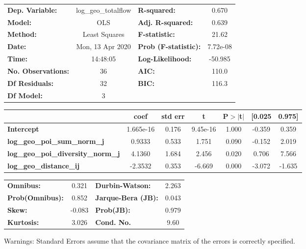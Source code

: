 \begin{center}
\begin{tabular}{lclc}
\toprule
\textbf{Dep. Variable:}                    & log\_geo\_totalflow & \textbf{  R-squared:         } &     0.670   \\
\textbf{Model:}                            &         OLS         & \textbf{  Adj. R-squared:    } &     0.639   \\
\textbf{Method:}                           &    Least Squares    & \textbf{  F-statistic:       } &     21.62   \\
\textbf{Date:}                             &   Mon, 13 Apr 2020  & \textbf{  Prob (F-statistic):} &  7.72e-08   \\
\textbf{Time:}                             &       14:48:05      & \textbf{  Log-Likelihood:    } &   -50.985   \\
\textbf{No. Observations:}                 &            36       & \textbf{  AIC:               } &     110.0   \\
\textbf{Df Residuals:}                     &            32       & \textbf{  BIC:               } &     116.3   \\
\textbf{Df Model:}                         &             3       & \textbf{                     } &             \\
\bottomrule
\end{tabular}
\begin{tabular}{lcccccc}
                                           & \textbf{coef} & \textbf{std err} & \textbf{t} & \textbf{P$> |$t$|$} & \textbf{[0.025} & \textbf{0.975]}  \\
\midrule
\textbf{Intercept}                         &    1.665e-16  &        0.176     &  9.45e-16  &         1.000        &       -0.359    &        0.359     \\
\textbf{log\_geo\_poi\_sum\_norm\_j}       &       0.9333  &        0.533     &     1.751  &         0.090        &       -0.152    &        2.019     \\
\textbf{log\_geo\_poi\_diversity\_norm\_j} &       4.1360  &        1.684     &     2.456  &         0.020        &        0.706    &        7.566     \\
\textbf{log\_geo\_distance\_ij}            &      -2.3532  &        0.353     &    -6.669  &         0.000        &       -3.072    &       -1.635     \\
\bottomrule
\end{tabular}
\begin{tabular}{lclc}
\textbf{Omnibus:}       &  0.321 & \textbf{  Durbin-Watson:     } &    2.263  \\
\textbf{Prob(Omnibus):} &  0.852 & \textbf{  Jarque-Bera (JB):  } &    0.043  \\
\textbf{Skew:}          & -0.083 & \textbf{  Prob(JB):          } &    0.979  \\
\textbf{Kurtosis:}      &  3.026 & \textbf{  Cond. No.          } &     9.60  \\
\bottomrule
\end{tabular}
\end{center}

Warnings: \newline
 [1] Standard Errors assume that the covariance matrix of the errors is correctly specified.